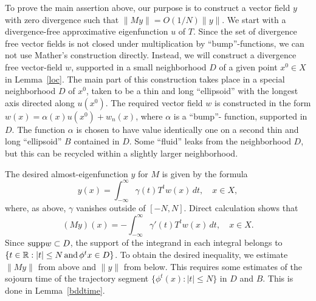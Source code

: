 To prove the main assertion above,
our purpose is to construct a
  vector field $y$ with zero divergence such that
$\|M y\| = O(1/N) \|y\|$. We start with a
divergence-free approximative eigenfunction $u$ of $T$.
Since the set of divergence
free vector fields is not closed under multiplication
by ``bump''-functions, we can not
use Mather's  construction directly.
Instead, we will
construct a divergence free vector-field $w$,
supported in a small neighborhood $D$ of a given point $x^0\in X$
in Lemma~\ref{loc}.
The main part of this construction takes place in a
special neighborhood $D$ of $x^0$,  taken to be a thin and long
``ellipsoid'' with
the longest axis directed along $u(x^0)$.
The required vector field $w$ is constructed in
the form $w(x)=\alpha(x) u(x^0)+w_n(x)$, where $\alpha$ is a
``bump''- function, supported in $D$.
The function $\alpha$ is chosen to have value identically one
on a second thin and long
``ellipsoid'' $B$ contained in $D$. Some ``fluid'' leaks from
the neighborhood $D$, but this can be recycled within a slightly
larger neighborhood.

The desired
almost-eigenfunction $y$ for $M$ is given by the formula
$$
y(x) = \int^{\infty}_{-\infty} \gamma(t) T^tw(x) \,dt,\quad x\in X,
$$
where, as above, $\gamma$ vanishes outside of $[-N,N]$.
Direct calculation shows that
$$
(My)(x) = -\int^{\infty}_{-\infty}
\gamma'(t) T^tw(x) \,dt, \quad x\in X.
$$
Since $\hbox{\rm supp} w\subset D$, the support of the integrand in each
integral belongs to
$\{t\in {\Bbb{R}}: |t|\le N\,\mbox{and}\,\phi^tx\in D\}$.
To obtain the desired inequality, we estimate
$\|My\|$ from above and $\|y\|$
from below.  This  requires some estimates of the sojourn time
of  the trajectory segment $\{\phi^t(x): |t|\leq N\}$ in
$D$ and $B$.
This is done in Lemma~\ref{bddtime}.

